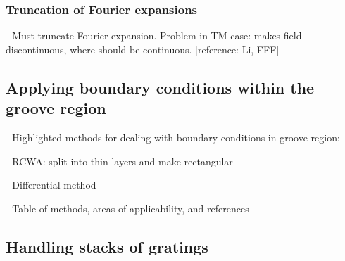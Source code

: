 \subsubsection{Truncation of Fourier expansions}
               - Must truncate Fourier expansion.  Problem in TM case: makes field discontinuous, where should be continuous. [reference: Li, FFF]
\subsection{Applying boundary conditions within the groove region}
          - Highlighted methods for dealing with boundary conditions in groove region:
          
               - RCWA: split into thin layers and make rectangular
               
               - Differential method
               
          - Table of methods, areas of applicability, and references
          
\subsection{Handling stacks of gratings}

